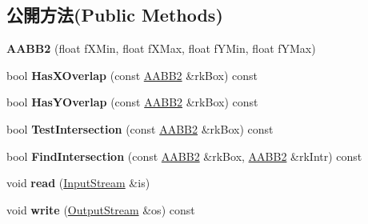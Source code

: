 \subsection*{公開方法(Public Methods)}
\begin{DoxyCompactItemize}
\item 
{\bfseries A\+A\+B\+B2} (float f\+X\+Min, float f\+X\+Max, float f\+Y\+Min, float f\+Y\+Max)\hypertarget{class_magnum_1_1_a_a_b_b2_ad4d727a2c66b90bb22a8c22e9b830589}{}\label{class_magnum_1_1_a_a_b_b2_ad4d727a2c66b90bb22a8c22e9b830589}

\item 
bool {\bfseries Has\+X\+Overlap} (const \hyperlink{class_magnum_1_1_a_a_b_b2}{A\+A\+B\+B2} \&rk\+Box) const \hypertarget{class_magnum_1_1_a_a_b_b2_abc2734442404f66a6099bc2fc38c346b}{}\label{class_magnum_1_1_a_a_b_b2_abc2734442404f66a6099bc2fc38c346b}

\item 
bool {\bfseries Has\+Y\+Overlap} (const \hyperlink{class_magnum_1_1_a_a_b_b2}{A\+A\+B\+B2} \&rk\+Box) const \hypertarget{class_magnum_1_1_a_a_b_b2_a531e23321014e2adc0468da4120bde68}{}\label{class_magnum_1_1_a_a_b_b2_a531e23321014e2adc0468da4120bde68}

\item 
bool {\bfseries Test\+Intersection} (const \hyperlink{class_magnum_1_1_a_a_b_b2}{A\+A\+B\+B2} \&rk\+Box) const \hypertarget{class_magnum_1_1_a_a_b_b2_ae5c96b6189b854a10bbc6949b87bf78a}{}\label{class_magnum_1_1_a_a_b_b2_ae5c96b6189b854a10bbc6949b87bf78a}

\item 
bool {\bfseries Find\+Intersection} (const \hyperlink{class_magnum_1_1_a_a_b_b2}{A\+A\+B\+B2} \&rk\+Box, \hyperlink{class_magnum_1_1_a_a_b_b2}{A\+A\+B\+B2} \&rk\+Intr) const \hypertarget{class_magnum_1_1_a_a_b_b2_a332fd7737dc2754744d4e1387270b4dc}{}\label{class_magnum_1_1_a_a_b_b2_a332fd7737dc2754744d4e1387270b4dc}

\item 
void {\bfseries read} (\hyperlink{class_magnum_1_1_input_stream}{Input\+Stream} \&is)\hypertarget{class_magnum_1_1_a_a_b_b2_a914cebba4a04cbbe29ad2ad8e4be6794}{}\label{class_magnum_1_1_a_a_b_b2_a914cebba4a04cbbe29ad2ad8e4be6794}

\item 
void {\bfseries write} (\hyperlink{class_magnum_1_1_output_stream}{Output\+Stream} \&os) const \hypertarget{class_magnum_1_1_a_a_b_b2_aa057b7088afb863bdabefa5aeb432dfa}{}\label{class_magnum_1_1_a_a_b_b2_aa057b7088afb863bdabefa5aeb432dfa}

\end{DoxyCompactItemize}
